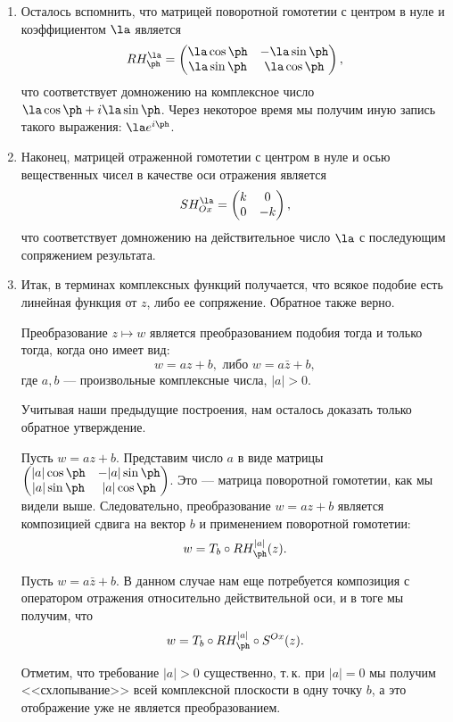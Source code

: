 \begin{enumerate}
\item Осталось вспомнить, что матрицей поворотной гомотетии с центром в нуле и коэффициентом $\la$ является
$$
RH_\ph^\la =
\begin{pmatrix}
\la\cos\ph & -\la\sin\ph \\ \la\sin\ph & \la\cos\ph
\end{pmatrix},
$$
что соответствует домножению на комплексное число $\la\cos\ph + i\la\sin\ph$. Через некоторое время мы получим иную запись такого выражения: $\la e^{i\ph}$.

\item Наконец, матрицей отраженной гомотетии с центром в нуле и осью вещественных чисел в качестве оси отражения является
$$
SH_{Ox}^\la =
\begin{pmatrix}
k & 0 \\ 0 & -k
\end{pmatrix},
$$
что соответствует домножению на действительное число $\la$ с последующим сопряжением результата.

\item Итак, в терминах комплексных функций получается, что всякое подобие есть линейная функция от $z$, либо ее сопряжение. Обратное также верно.
\begin{thrm} Преобразование $z\mapsto w$ является преобразованием подобия тогда и только тогда, когда оно имеет вид:
$$
w = az+b,\mbox{ либо }w = a\bar z+b,
$$
где $a,b$ --- произвольные комплексные числа, $|a|>0$.
\end{thrm}
\pf
Учитывая наши предыдущие построения, нам осталось доказать только обратное утверждение.

Пусть $w=az+b$. Представим число $a$ в виде матрицы $\displaystyle \begin{pmatrix}|a|\cos\ph & -|a|\sin\ph \\ |a|\sin\ph & |a|\cos\ph\end{pmatrix}$. Это --- матрица поворотной гомотетии, как мы видели выше. Следовательно, преобразование $w=az+b$ является композицией сдвига на вектор $b$ и применением поворотной гомотетии:
$$
w = T_b\circ RH_\ph^{|a|}(z).
$$

Пусть $w=a\bar z+b$. В данном случае нам еще потребуется композиция с оператором отражения относительно действительной оси, и в тоге мы получим, что
$$
w = T_b\circ RH_\ph^{|a|}\circ S^{Ox}(z).
$$

Отметим, что требование $|a|>0$ существенно, т.\,к. при $|a|=0$ мы получим <<схлопывание>> всей комплексной плоскости в одну точку $b$, а это отображение уже не является преобразованием.
\epf




\end{enumerate}
